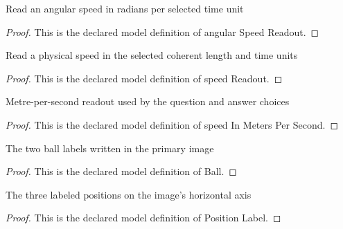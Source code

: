 \begin{definition}
  \label{def:physics:phyx-mini-0696:phyxminiproblems-problemphyxmini0696-angularspeedreadout}
  Read an angular speed in radians per selected time unit
\end{definition}
\begin{proof}
  This is the declared model definition of angular Speed Readout.
\end{proof}
\begin{definition}
  \label{def:physics:phyx-mini-0696:phyxminiproblems-problemphyxmini0696-speedreadout}
  Read a physical speed in the selected coherent length and time units
\end{definition}
\begin{proof}
  This is the declared model definition of speed Readout.
\end{proof}
\begin{definition}
  \label{def:physics:phyx-mini-0696:phyxminiproblems-problemphyxmini0696-speedinmeterspersecond}
  Metre-per-second readout used by the question and answer choices
\end{definition}
\begin{proof}
  This is the declared model definition of speed In Meters Per Second.
\end{proof}
\begin{definition}[Ball]
  \label{def:physics:phyx-mini-0696:phyxminiproblems-problemphyxmini0696-ball}
  The two ball labels written in the primary image
\end{definition}
\begin{proof}
  This is the declared model definition of Ball.
\end{proof}
\begin{definition}
  \label{def:physics:phyx-mini-0696:phyxminiproblems-problemphyxmini0696-positionlabel}
  The three labeled positions on the image's horizontal axis
\end{definition}
\begin{proof}
  This is the declared model definition of Position Label.
\end{proof}
